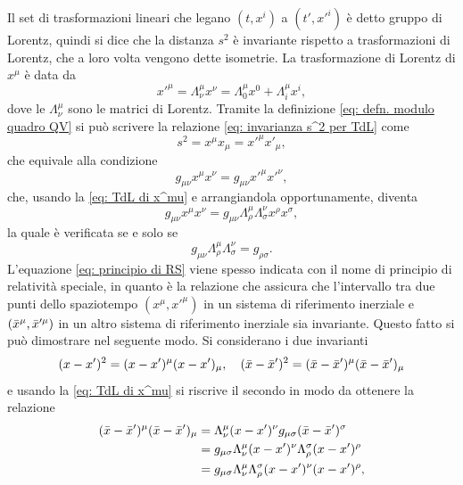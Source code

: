 Il set di trasformazioni lineari che legano $(t,x^i)$ a $(t',x'^i)$ è detto gruppo di Lorentz, quindi si dice che la distanza $s^2$ è invariante rispetto a trasformazioni di Lorentz, che a loro volta vengono dette isometrie. La trasformazione di Lorentz di $x^\mu$ è data da
\begin{equation}
\label{eq: TdL di x^mu}
    x'^\mu = \Lambda^\mu_\nu x^\nu = \Lambda^\mu_0 x^0 + \Lambda^\mu_i x^i,
\end{equation}
dove le $\Lambda^\mu_\nu$ sono le matrici di Lorentz. Tramite la definizione \eqref{eq: defn. modulo quadro QV} si può scrivere la relazione \eqref{eq: invarianza s^2 per TdL} come
\begin{equation}
    s^2 = x^\mu x_\mu = x'^\mu x'_\mu,
\end{equation}
che equivale alla condizione
\begin{equation}
    g_{\mu\nu}x^\mu x^\nu = g_{\mu\nu}x'^\mu x'^\nu,
\end{equation}
che, usando la \eqref{eq: TdL di x^mu} e arrangiandola opportunamente, diventa
\begin{equation}
    g_{\mu\nu}x^\mu x^\nu = g_{\mu\nu}\Lambda^\mu_\rho \Lambda^\nu_\sigma x^\rho x^\sigma,
\end{equation}
la quale è verificata se e solo se
\begin{equation}
\label{eq: principio di RS}
    g_{\mu\nu}\Lambda^\mu_\rho \Lambda^\nu_\sigma = g_{\rho\sigma}.
\end{equation}
L'equazione \eqref{eq: principio di RS} viene spesso indicata con il nome di principio di relatività speciale, in quanto è la relazione che assicura che l'intervallo tra due punti dello spaziotempo $(x^\mu,x'^\mu)$ in un sistema di riferimento inerziale e $(\bar{x}^\mu,\bar{x}'^\mu)$ in un altro sistema di riferimento inerziale sia invariante. Questo fatto si può dimostrare nel seguente modo. Si considerano i due invarianti
\begin{equation}
    (x-x')^2 = (x-x')^\mu(x-x')_\mu,\quad(\bar{x}-\bar{x}')^2 = (\bar{x}-\bar{x}')^\mu(\bar{x}-\bar{x}')_\mu
\end{equation}
e usando la \eqref{eq: TdL di x^mu} si riscrive il secondo in modo da ottenere la relazione
\begin{equation}
    \begin{split}
        (\bar{x}-\bar{x}')^\mu(\bar{x}-\bar{x}')_\mu &= \Lambda_\nu^\mu(x-x')^\nu g_{\mu\sigma}(\bar{x}-\bar{x}')^\sigma \\
        &= g_{\mu\sigma}\Lambda_\nu^\mu(x-x')^\nu\Lambda^\sigma_\rho(x-x')^\rho \\
        &= g_{\mu\sigma}\Lambda_\nu^\mu\Lambda^\sigma_\rho(x-x')^\nu(x-x')^\rho,
    \end{split}
\end{equation}
